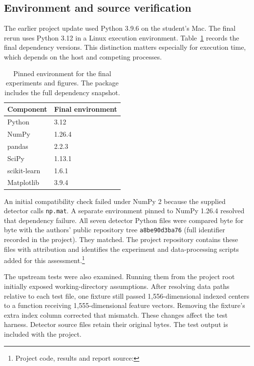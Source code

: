 \documentclass[11pt]{article}
\begin{document}
\subsection{Environment and source verification}
The earlier project update used Python 3.9.6 on the student's Mac. The final rerun uses Python 3.12 in a Linux execution environment. Table~\ref{tab:environment} records the final dependency versions. This distinction matters especially for execution time, which depends on the host and competing processes.

\begin{table}[t]
\centering\small
\begin{tabular}{ll}\toprule
Component & Final environment \\ \midrule
Python & 3.12 \\
NumPy & 1.26.4 \\
pandas & 2.2.3 \\
SciPy & 1.13.1 \\
scikit-learn & 1.6.1 \\
Matplotlib & 3.9.4 \\
\bottomrule\end{tabular}
\caption{Pinned environment for the final experiments and figures. The package includes the full dependency snapshot.}\label{tab:environment}
\end{table}

An initial compatibility check failed under NumPy 2 because the supplied detector calls \texttt{np.mat}. A separate environment pinned to NumPy 1.26.4 resolved that dependency failure. All seven detector Python files were compared byte for byte with the authors' public repository tree \texttt{a8be90d3ba76} (full identifier recorded in the project). They matched. The project repository contains these files with attribution and identifies the experiment and data-processing scripts added for this assessment.\footnote{Project code, results and report source: \projectrepository}

The upstream tests were also examined. Running them from the project root initially exposed working-directory assumptions. After resolving data paths relative to each test file, one fixture still passed 1,556-dimensional indexed centers to a function receiving 1,555-dimensional feature vectors. Removing the fixture's extra index column corrected that mismatch. These changes affect the test harness. Detector source files retain their original bytes. The test output is included with the project.
\end{document}
